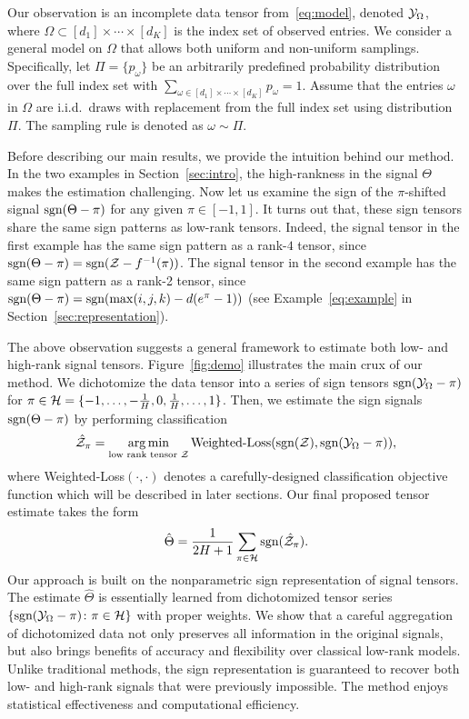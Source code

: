 \documentclass[11pt]{article}
\theoremstyle{plain}
\theoremstyle{definition}
\def\sign{\textup{sgn}}
\begin{document}
Our observation is an incomplete data tensor from~\eqref{eq:model}, denoted  $\mathcal{Y}_\Omega$, where $\Omega\subset[d_1]\times\cdots\times[d_K]$ is the index set of observed entries. We consider a general model on $\Omega$ that allows both uniform and non-uniform samplings. Specifically, let $\Pi=\{p_\omega\}$ be an arbitrarily predefined probability distribution over the full index set with $\sum_{\omega\in[d_1]\times \cdots \times [d_K]}p_\omega=1$. Assume that the entries $\omega$ in $\Omega$ are i.i.d.\ draws with replacement from the full index set using distribution $\Pi$. The sampling rule is denoted as $\omega\sim \Pi$. 

Before describing our main results, we provide the intuition behind our method. In the two examples in Section~\ref{sec:intro}, the high-rankness in the signal $\Theta$ makes the estimation challenging. Now let us examine the sign of the $\pi$-shifted signal $\sign(\Theta-\pi)$ for any given $\pi\in[-1,1]$. It turns out that, these sign tensors share the same sign patterns as low-rank tensors. Indeed, the signal tensor in the first example has the same sign pattern as a rank-$4$ tensor, since $\sign(\Theta-\pi)=\sign(\tZ-f^{-1}(\pi))$. The signal tensor in the second example has the same sign pattern as a rank-2 tensor, since $\sign(\Theta-\pi)=\sign(\max(i,j,k)-d(e^{\pi}-1))$ (see Example~\ref{eq:example} in Section~\ref{sec:representation}).


The above observation suggests a general framework to estimate both low- and high-rank signal tensors. Figure~\ref{fig:demo} illustrates the main crux of our method. We dichotomize the data tensor into a series of sign tensors $\sign (\tY_\Omega-\pi)$ for $\pi\in \mathcal{H}={\{\small-1,\ldots,  -{1\over H},0, {1\over H},\ldots,1\}}$. Then, we estimate the sign signals $\sign(\Theta-\pi)$ by performing classification
\[
\hat \tZ_\pi=\argmin_{\text{low rank tensor $\tZ$}} \text{Weighted-Loss}(\sign(\tZ), \sign (\tY_\Omega-\pi)),
\]
where Weighted-Loss$(\cdot,\cdot)$ denotes a carefully-designed classification objective function which will be described in later sections. Our final proposed tensor estimate takes the form
\[
\hat \Theta = {1\over 2H+1}\sum_{\pi \in \tH} \sign(\hat \tZ_\pi).
\]
Our approach is built on the nonparametric sign representation of signal tensors. The estimate $\hat \Theta$ is essentially learned from dichotomized tensor series $\{\sign(\tY_\Omega-\pi)\colon \pi \in \tH\}$ with proper weights. We show that a careful aggregation of dichotomized data not only preserves all information in the original signals, but also brings benefits of accuracy and flexibility over classical low-rank models. Unlike traditional methods, the sign representation is guaranteed to recover both low- and high-rank signals that were previously impossible. The method enjoys statistical effectiveness and computational efficiency. 
\end{document}
